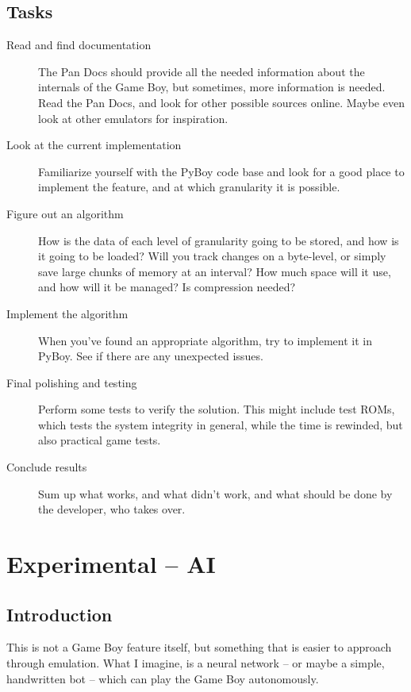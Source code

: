 \documentclass[11pt]{report} %
\begin{document}
\section*{Tasks}
\begin{description}
    \item [Read and find documentation]
        The Pan Docs should provide all the needed information about the internals of the Game Boy, but sometimes, more information is needed. Read the Pan Docs, and look for other possible sources online. Maybe even look at other emulators for inspiration.

    \item [Look at the current implementation]
        Familiarize yourself with the PyBoy code base and look for a good place to implement the feature, and at which granularity it is possible.

    \item [Figure out an algorithm]
        How is the data of each level of granularity going to be stored, and how is it going to be loaded? Will you track changes on a byte-level, or simply save large chunks of memory at an interval? How much space will it use, and how will it be managed? Is compression needed?

    \item [Implement the algorithm]
        When you've found an appropriate algorithm, try to implement it in PyBoy. See if there are any unexpected issues.

    \item [Final polishing and testing]
        Perform some tests to verify the solution. This might include test ROMs, which tests the system integrity in general, while the time is rewinded, but also practical game tests.

    \item [Conclude results]
        Sum up what works, and what didn't work, and what should be done by the developer, who takes over.

\end{description}

\chapter*{Experimental -- AI}
\section*{Introduction}
This is not a Game Boy feature itself, but something that is easier to approach through emulation. What I imagine, is a neural network -- or maybe a simple, handwritten bot -- which can play the Game Boy autonomously.
\end{document}
